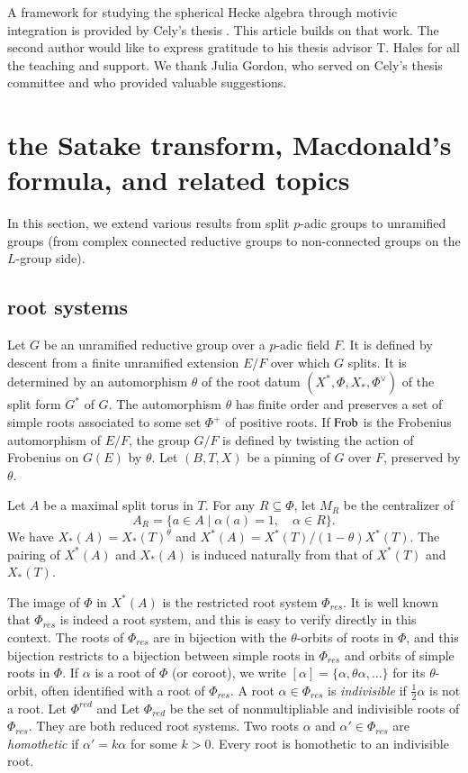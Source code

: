 A framework for studying the spherical Hecke algebra through motivic
integration is provided by Cely's thesis \cite{cely}.  This article
builds on that work.  The second author would like to
express gratitude to his thesis advisor T. Hales for all the
teaching and support.  We thank Julia Gordon, who served on Cely's
thesis committee and who provided valuable suggestions.



\section{the Satake transform, Macdonald's formula, and related topics}

In this section, we extend various results from split $p$-adic groups
to unramified groups (from complex connected reductive groups to
non-connected groups on the $L$-group side).

\subsection{root systems}

Let $G$ be an unramified reductive group over a $p$-adic field $F$.
It is defined by descent from a finite unramified extension $E/F$ over
which $G$ splits.  It is determined by an automorphism $\theta$ of the
root datum $(X^*,\Phi,X_*,\Phi^\vee)$ of the split form $G^*$ of $G$.
The automorphism $\theta$ has finite order and preserves a set of
simple roots associated to some set $\Phi^+$ of positive roots.  If
${\operatorname{Frob}}$ is the Frobenius automorphism of $E/F$, the group $G/F$ is
defined by twisting the action of Frobenius on $G(E)$ by $\theta$.  Let
$(B,T,X)$ be a pinning of $G$ over $F$, preserved by $\theta$.

Let $A$ be a maximal split torus in $T$.  For any $R\subseteq \Phi$,
let $M_R$ be the centralizer of
\[
A_R = \{a\in A\mid \alpha(a)=1,\quad \alpha\in R\}.
\]
We have $X_*(A) = X_*(T)^\theta$ and $X^*(A) =
X^*(T)/(1-\theta)X^*(T)$.  The pairing of $X^*(A)$ and $X_*(A)$ is
induced naturally from that of $X^*(T)$ and $X_*(T)$.

The image of $\Phi$ in $X^*(A)$ is the restricted root system $\Phi_{res}$.
It is well known that $\Phi_{res}$ is indeed a root system, and this is
easy to verify directly in this context.  The roots of $\Phi_{res}$ are in
bijection with the $\theta$-orbits of roots in $\Phi$, and this
bijection restricts to a bijection between simple roots in $\Phi_{res}$
and orbits of simple roots in $\Phi$.  If $\alpha$ is a root of $\Phi$
(or coroot), we write $[\alpha]=\{\alpha,\theta\alpha,\ldots\}$ for
its $\theta$-orbit, often identified with a root of $\Phi_{res}$.
A root $\alpha\in\Phi_{res}$ is {\it indivisible} if $\frac12\alpha$ is not a root.
Let $\Phi^{red}$ and 
Let $\Phi_{red}$ be the set of nonmultipliable and
indivisible roots of $\Phi_{res}$.  %
They are both reduced root systems.
Two roots $\alpha$ and $\alpha'\in\Phi_{res}$ are {\it homothetic} if
$\alpha' = k\alpha$ for some $k>0$.  Every root is homothetic to an
indivisible root.  %

